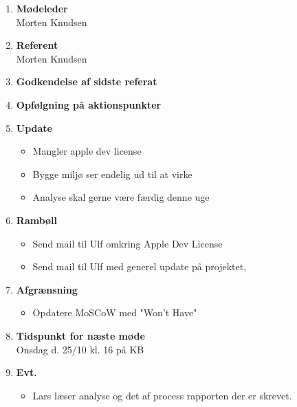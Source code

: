 	\begin{enumerate}
		\itemsep 0.3em 
		\item \textbf{Mødeleder}\\
			Morten Knudsen
		\item \textbf{Referent}\\
			Morten Knudsen
		\item \textbf{Godkendelse af sidste referat}
			
		\item\textbf{Opfølgning på aktionspunkter}

		\item \textbf{Update}
			\begin{itemize}[-]
				\item Mangler apple dev license
				\item Bygge miljø ser endelig ud til at virke
				\item Analyse skal gerne være færdig denne uge
			\end{itemize}
	
		\item \textbf{Rambøll}
		\begin{itemize}[-]
			\item Send mail til Ulf omkring Apple Dev License
			\item Send mail til Ulf med generel update på projektet,
		\end{itemize}
	
			\item \textbf{Afgrænsning}
		\begin{itemize}[-]
			\item Opdatere MoSCoW med "Won't Have"
		\end{itemize}
	
		\item \textbf{Tidspunkt for næste møde} \\
			Onsdag d. 25/10 kl. 16 på KB
			
		\item \textbf{Evt.}
			\begin{itemize}[-]
				\item Lars læser analyse og det af process rapporten der er skrevet.
			\end{itemize}
			
	\end{enumerate}
